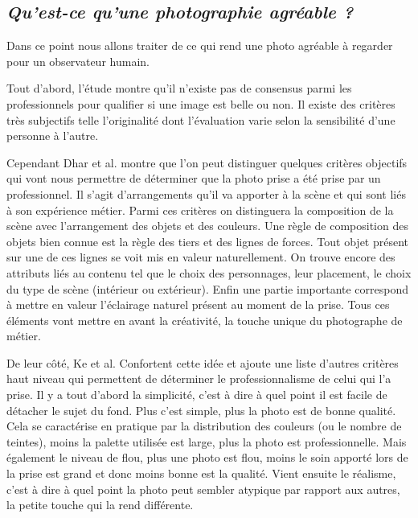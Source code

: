 \documentclass[11pt, french]{report-rd-info}
\begin{document}
\subsection{\emph{Qu’est-ce qu’une photographie agréable ?}}


Dans ce point nous allons traiter de ce qui rend une photo agréable à regarder pour un observateur humain.



Tout d’abord, l’étude \cite{Datta} montre qu’il n’existe pas de consensus parmi les professionnels pour qualifier si une image est belle ou non. Il existe des critères très subjectifs telle l’originalité dont l’évaluation varie selon la sensibilité d’une personne à l’autre.



Cependant Dhar et al. \cite{Dhar} montre que l’on peut distinguer quelques critères objectifs qui vont nous permettre de déterminer que la photo prise a été prise par un professionnel. Il s’agit  d’arrangements qu’il va apporter à la scène et qui sont liés à son expérience métier. Parmi ces critères on distinguera la composition de la scène avec l'arrangement des objets et des couleurs. Une règle de composition des objets bien connue est la règle des tiers et des lignes de forces. Tout objet présent sur une de ces lignes se voit mis en valeur naturellement. On trouve encore des attributs liés au contenu tel que le choix des personnages, leur placement, le choix du type de scène (intérieur ou extérieur). Enfin une partie importante correspond à mettre en valeur l'éclairage naturel présent au moment de la prise. Tous ces éléments vont mettre en avant la créativité, la touche unique du photographe de métier.



De leur côté, Ke et al. Confortent cette idée et ajoute une liste d’autres critères haut niveau qui permettent de déterminer le professionnalisme de celui qui l’a prise. Il y a tout d’abord la simplicité, c'est à dire à quel point il est facile de détacher le sujet du fond. Plus c'est simple, plus la photo est de bonne qualité. Cela se caractérise en pratique par la distribution des couleurs (ou le nombre de teintes), moins la palette utilisée est large, plus la photo est professionnelle. Mais également le niveau de flou, plus une photo est flou, moins le soin apporté lors de la prise est grand et donc moins bonne est la qualité.
Vient ensuite le réalisme, c'est à dire à quel point la photo peut sembler atypique par rapport aux autres, la petite touche qui la rend différente. 
\end{document}
